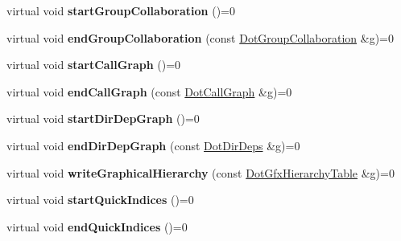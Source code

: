 \begin{DoxyCompactItemize}
\item 
\hypertarget{class_output_generator_a8f6ba5502347200c65ed6496db94f1b5}{virtual void {\bfseries start\-Group\-Collaboration} ()=0}\label{class_output_generator_a8f6ba5502347200c65ed6496db94f1b5}

\item 
\hypertarget{class_output_generator_a5fa81b08226d2772da2e486b6a1ff8cf}{virtual void {\bfseries end\-Group\-Collaboration} (const \hyperlink{class_dot_group_collaboration}{Dot\-Group\-Collaboration} \&g)=0}\label{class_output_generator_a5fa81b08226d2772da2e486b6a1ff8cf}

\item 
\hypertarget{class_output_generator_a5a2bfb0ad846a5e33ab7c969f6d42264}{virtual void {\bfseries start\-Call\-Graph} ()=0}\label{class_output_generator_a5a2bfb0ad846a5e33ab7c969f6d42264}

\item 
\hypertarget{class_output_generator_aab9e193b9be9004be28eed645204cfaf}{virtual void {\bfseries end\-Call\-Graph} (const \hyperlink{class_dot_call_graph}{Dot\-Call\-Graph} \&g)=0}\label{class_output_generator_aab9e193b9be9004be28eed645204cfaf}

\item 
\hypertarget{class_output_generator_afc54c6bab244824c9e7d28994fedd86e}{virtual void {\bfseries start\-Dir\-Dep\-Graph} ()=0}\label{class_output_generator_afc54c6bab244824c9e7d28994fedd86e}

\item 
\hypertarget{class_output_generator_aba07050fb95d7e66a708bac2a5e66784}{virtual void {\bfseries end\-Dir\-Dep\-Graph} (const \hyperlink{class_dot_dir_deps}{Dot\-Dir\-Deps} \&g)=0}\label{class_output_generator_aba07050fb95d7e66a708bac2a5e66784}

\item 
\hypertarget{class_output_generator_aff9d99a9a761fecaba7e46d035c71136}{virtual void {\bfseries write\-Graphical\-Hierarchy} (const \hyperlink{class_dot_gfx_hierarchy_table}{Dot\-Gfx\-Hierarchy\-Table} \&g)=0}\label{class_output_generator_aff9d99a9a761fecaba7e46d035c71136}

\item 
\hypertarget{class_output_generator_a8da17f829e7c67fc5f850f2ac84ba70a}{virtual void {\bfseries start\-Quick\-Indices} ()=0}\label{class_output_generator_a8da17f829e7c67fc5f850f2ac84ba70a}

\item 
\hypertarget{class_output_generator_a3564a997cc2a3cbd67dabae7fbb7e5a3}{virtual void {\bfseries end\-Quick\-Indices} ()=0}\label{class_output_generator_a3564a997cc2a3cbd67dabae7fbb7e5a3}


\end{DoxyCompactItemize}
